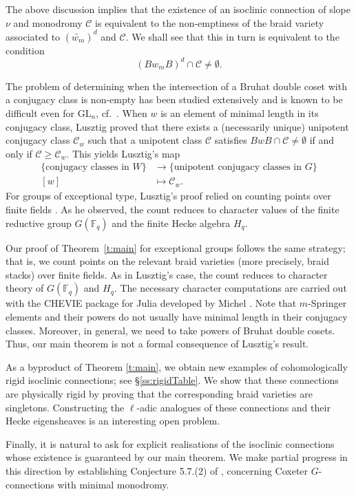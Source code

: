 \documentclass[11pt]{amsart}
\theoremstyle{definition}
\newcommand{\GL}{\mathrm{GL}}
\newcommand{\cC}{\mathcal{C}}
\newcommand{\Fq}{\mathbb{F}_q}
\begin{document}
The above discussion implies that the existence of an isoclinic connection of slope $\nu$ and monodromy $\cC$ is equivalent to the non-emptiness of the braid variety associated to $(\widetilde{w_m})^d$ and $\cC$. We shall see that this in turn is equivalent to the condition 
\[
(Bw_mB)^d\cap \cC\neq \emptyset. 
\]

The problem of determining when the intersection of a Bruhat double coset with a conjugacy class is non-empty  has been studied extensively and is known to be difficult even for $\GL_n$, cf.\ \cite{EG04, EG07, CLT10, Lusztig, LusztigCSmall, Malten}. When  $w$ is an element of minimal length in its conjugacy class, Lusztig proved that there exists a (necessarily unique) unipotent conjugacy class $\cC_w$ such that a unipotent class $\cC$ satisfies $BwB\cap \cC\neq \emptyset$ if and only if $\cC\geq \cC_w$. This yields Lusztig's map 
\[
\begin{aligned}
\{\textrm{conjugacy classes in } W\} 
  &\longrightarrow \{\textrm{unipotent conjugacy classes in } G\} \\
[w] &\longmapsto \cC_w.
\end{aligned}
\]
For groups of exceptional type, Lusztig's proof relied on counting points over finite fields \cite{Lusztig}. As he observed, the count reduces to  character values of the finite reductive group $G(\Fq)$ and the finite Hecke algebra $H_q$.
 
  Our proof of Theorem~\ref{t:main} for exceptional groups follows the same strategy; that is, we count points on the relevant braid varieties (more precisely, braid stacks) over finite fields. As in Lusztig's case, the count reduces to character theory of $G(\Fq)$ and $H_q$. The necessary character  computations are carried out with the CHEVIE package for Julia developed by Michel \cite{Michel}. Note that $m$-Springer elements and their powers do not usually have minimal length in their conjugacy classes. Moreover, in general, we need to take powers of Bruhat double cosets. Thus, our main theorem is not a formal consequence of Lusztig's result. 

As a byproduct of Theorem \ref{t:main}, we obtain new examples of cohomologically rigid  isoclinic connections; see \S \ref{ss:rigidTable}. We show that these connections are physically rigid by proving that the corresponding braid varieties are singletons. Constructing the $\ell$-adic analogues of these connections and their Hecke eigensheaves is an interesting open problem.

Finally, it is natural to ask for explicit realisations of the isoclinic connections whose existence is guaranteed by our main theorem. We make partial progress in this direction by establishing Conjecture 5.7.(2) of \cite{SageReview}, concerning Coxeter $G$-connections with minimal monodromy. 
\end{document}
